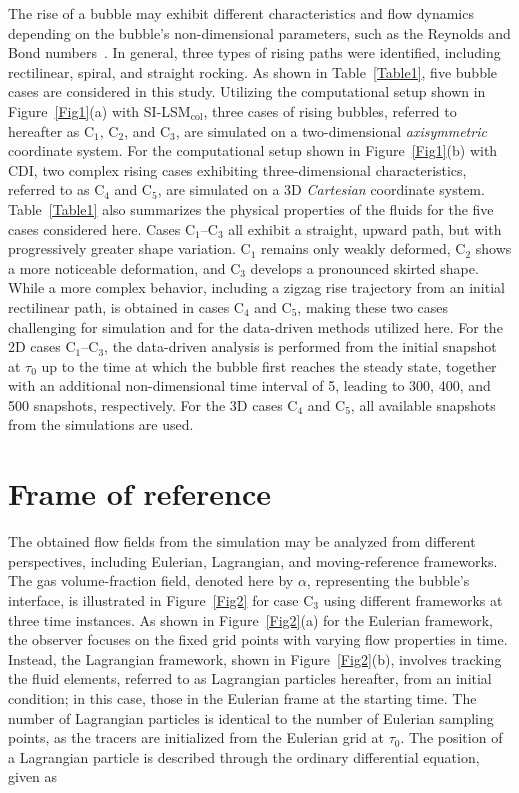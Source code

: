 \documentclass[a4paper,fleqn]{cas-sc}
\begin{document}
	The rise of a bubble may exhibit different characteristics and flow dynamics depending on the bubble's non-dimensional parameters, such as the Reynolds and Bond numbers~\cite{Cano-Lozano2016, Hua2007}. In general, three types of rising paths were identified, including rectilinear, spiral, and straight rocking. As shown in Table~\ref{Table1}, five bubble cases are considered in this study. Utilizing the computational setup shown in Figure~\ref{Fig1}(a) with SI-LSM$_{\text{col}}$, three cases of rising bubbles, referred to hereafter as C$_1$, C$_2$, and C$_3$, are simulated on a two-dimensional \textit{axisymmetric} coordinate system. For the computational setup shown in Figure~\ref{Fig1}(b) with CDI, two complex rising cases exhibiting three-dimensional characteristics, referred to as C$_4$ and C$_5$, are simulated on a 3D \textit{Cartesian} coordinate system. Table~\ref{Table1} also summarizes the physical properties of the fluids for the five cases considered here. Cases C$_1$--C$_3$ all exhibit a straight, upward path, but with progressively greater shape variation. C$_1$ remains only weakly deformed, C$_2$ shows a more noticeable deformation, and C$_3$ develops a pronounced skirted shape. While a more complex behavior, including a zigzag rise trajectory from an initial rectilinear path, is obtained in cases C$_4$ and C$_5$, making these two cases challenging for simulation and for the data-driven methods utilized here. For the 2D cases C$_1$--C$_3$, the data-driven analysis is performed from the initial snapshot at $\tau_0$ up to the time at which the bubble first reaches the steady state, together with an additional non-dimensional time interval of 5, leading to 300, 400, and 500 snapshots, respectively. For the 3D cases C$_4$ and C$_5$, all available snapshots from the simulations are used.
	
	\section{Frame of reference}
	\label{framework}
	
	The obtained flow fields from the simulation may be analyzed from different perspectives, including Eulerian, Lagrangian, and moving-reference frameworks. The gas volume-fraction field, denoted here by $\alpha$, representing the bubble's interface, is illustrated in Figure~\ref{Fig2} for case C$_3$ using different frameworks at three time instances. As shown in Figure~\ref{Fig2}(a) for the Eulerian framework, the observer focuses on the fixed grid points with varying flow properties in time. Instead, the Lagrangian framework, shown in Figure~\ref{Fig2}(b), involves tracking the fluid elements, referred to as Lagrangian particles hereafter, from an initial condition; in this case, those in the Eulerian frame at the starting time. The number of Lagrangian particles is identical to the number of Eulerian sampling points, as the tracers are initialized from the Eulerian grid at $\tau_0$. The position of a Lagrangian particle is described through the ordinary differential equation, given as
	
\end{document}
